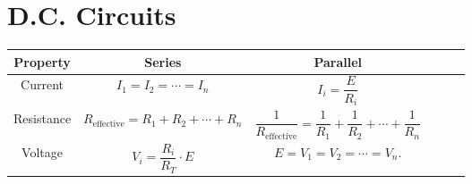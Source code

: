 \documentclass[oneside]{book}
\begin{document}
\chapter{D.C. Circuits}
\begin{center}
    \begin{tabular}{|Sc|Sc|Sc|}
        \hline
        Property & Series & Parallel\\
        \hline
        Current & \(I_1=I_2=\cdots=I_n\) & \(I_i=\dfrac{E}{R_i}\)\\
        \hline
        Resistance & \(R_{\text{effective}}=R_1+R_2+\cdots+R_n\) & \(\dfrac{1}{R_{\text{effective}}}=\dfrac{1}{R_1}+\dfrac{1}{R_2}+\cdots+\dfrac{1}{R_n}\)\\
        \hline
        Voltage & \(V_i=\dfrac{R_i}{R_T}\cdot E\) & \(E=V_1=V_2=\cdots=V_n\).\\
        \hline
    \end{tabular}
\end{center}
\end{document}
